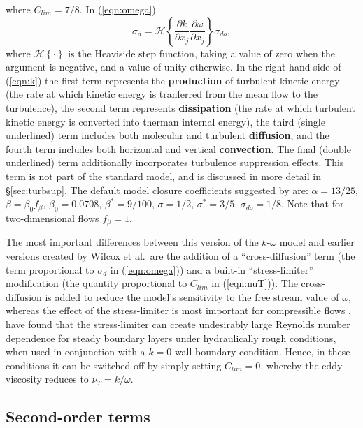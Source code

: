 \documentclass[12pt]{article}
\begin{document}
%
where $C_{lim}=7/8$.  In
(\ref{eqn:omega})
%
\begin{equation}
\sigma_d = \mathscr{H}\left\{\frac{\partial k}{\partial
      x_j}\frac{\partial \omega}{\partial x_j}\right\}\sigma_{do},
\end{equation}
%
where $\mathscr{H}\left\{\cdot\right\}$ is the Heaviside step
function, taking a value of zero when the argument is negative, and a
value of unity otherwise.  In the right hand side of (\ref{eqn:k}) the
first term represents the {\bf production} of turbulent kinetic energy
(the rate at which kinetic energy is tranferred from the mean flow to
the turbulence), the second term represents {\bf dissipation} (the
rate at which turbulent kinetic energy is converted into therman
internal energy), the third (single underlined) term includes both
molecular and turbulent {\bf diffusion}, and the fourth term includes
both horizontal and vertical {\bf convection}.  The final (double
underlined) term additionally incorporates turbulence suppression
effects.  This term is not part of the standard \cite{Wilcox2006}
model, and is discussed in more detail in \S\ref{sec:turbsup}.  The
default model closure coefficients suggested by \cite{Wilcox2006} are:
$\alpha=13/25$, $\beta=\beta_0 f_\beta$, $\beta_0=0.0708$,
$\beta^*=9/100$, $\sigma=1/2$, $\sigma^*=3/5$, $\sigma_{do}=1/8$.
Note that for two-dimensional flows $f_\beta=1$.

The most important differences between this version of the
$k$-$\omega$ model and earlier versions created by Wilcox et al.~are
the addition of a ``cross-diffusion'' term (the term proportional to
$\sigma_d$ in (\ref{eqn:omega})) and a built-in ``stress-limiter''
modification (the quantity proportional to $C_{lim}$ in
(\ref{eqn:nuT})).  The cross-diffusion is added to reduce the model's
sensitivity to the free stream value of $\omega$, whereas the effect
of the stress-limiter is most important for compressible flows
\citep{Wilcox2006}.  \cite{Fuhrmanetal2010} have found that the
stress-limiter can create undesirably large Reynolds number dependence
for steady boundary layers under hydraulically rough conditions, when
used in conjunction with a $k=0$ wall boundary condition.  Hence, in
these conditions it can be switched off by simply setting $C_{lim}=0$,
whereby the eddy viscosity reduces to $\nu_T=k/\omega$.

\subsection{Second-order terms}
\end{document}

